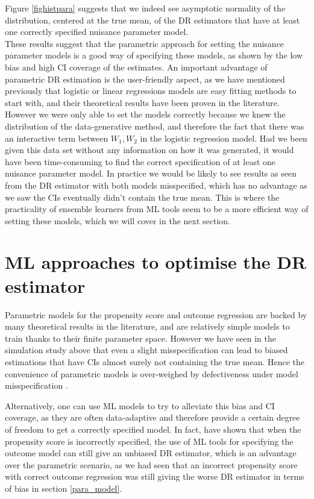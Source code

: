 \documentclass[12pt,twoside]{article}
\begin{document}
Figure \ref{fighistpara} suggests that we indeed see asymptotic normality of the distribution, centered at the true mean, of the DR estimators that have at least one correctly specified nuisance parameter model.\\

These results suggest that the parametric approach for setting the nuisance parameter models is a good way of specifying these models, as shown by the low bias and high CI coverage of the estimates. An important advantage of parametric DR estimation is the user-friendly aspect, as we have mentioned previously that logistic or linear regressions models are easy fitting methods to start with, and their theoretical results have been proven in the literature. However we were only able to set the models correctly because we knew the distribution of the data-generative method, and therefore the fact that there was an interactive term between $W_1,W_2$ in the logistic regression model. Had we been given this data set without any information on how it was generated, it would have been time-consuming to find the correct specification of at least one nuisance parameter model. In practice we would be likely to see results as seen from the DR estimator with both models misspecified, which has no advantage as we saw the CIs eventually didn't contain the true mean. This is where the practicality of ensemble learners from ML tools seem to be a more efficient way of setting these models, which we will cover in the next section.

\clearpage
\section{ML approaches to optimise the DR estimator}

Parametric models for the propensity score and outcome regression are backed by many theoretical results in the literature, and are relatively simple models to train thanks to their finite parameter space. However we have seen in the simulation study above that even a slight misspecification can lead to biased estimations that have CIs almost surely not containing the true mean. Hence the convenience of parametric models is over-weighed by defectiveness under model misspecification \citep{diaz}.

Alternatively, one can use ML models to try to alleviate this bias and CI coverage, as they are often data-adaptive and therefore provide a certain degree of freedom to get a correctly specified model. In fact, \citet{ps_SL} have shown that when the propensity score is incorrectly specified, the use of ML tools for specifying the outcome model can still give an unbiased DR estimator, which is an advantage over the parametric scenario, as we had seen that an incorrect propensity score with correct outcome regression was still giving the worse DR estimator in terms of bias in section \ref{para_model}.
\end{document}
